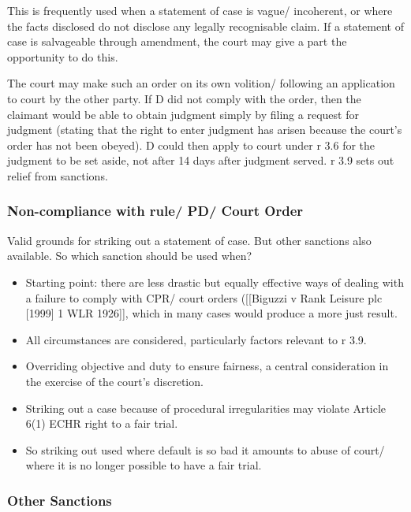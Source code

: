 \documentclass[
]{article}
\providecommand{\tightlist}{%
  \setlength{\itemsep}{0pt}\setlength{\parskip}{0pt}}
\begin{document}
This is frequently used when a statement of case is vague/ incoherent,
or where the facts disclosed do not disclose any legally recognisable
claim. If a statement of case is salvageable through amendment, the
court may give a part the opportunity to do this.

The court may make such an order on its own volition/ following an
application to court by the other party. If D did not comply with the
order, then the claimant would be able to obtain judgment simply by
filing a request for judgment (stating that the right to enter judgment
has arisen because the court's order has not been obeyed). D could then
apply to court under r 3.6 for the judgment to be set aside, not after
14 days after judgment served. r 3.9 sets out relief from sanctions.

\hypertarget{non-compliance-with-rule-pd-court-order}{%
\subsubsection{Non-compliance with rule/ PD/ Court
Order}\label{non-compliance-with-rule-pd-court-order}}

Valid grounds for striking out a statement of case. But other sanctions
also available. So which sanction should be used when?

\begin{itemize}
\tightlist
\item
  Starting point: there are less drastic but equally effective ways of
  dealing with a failure to comply with CPR/ court orders ({[}{[}Biguzzi
  v Rank Leisure plc {[}1999{]} 1 WLR 1926{]}{]}, which in many cases
  would produce a more just result.
\item
  All circumstances are considered, particularly factors relevant to r
  3.9.
\item
  Overriding objective and duty to ensure fairness, a central
  consideration in the exercise of the court's discretion.
\item
  Striking out a case because of procedural irregularities may violate
  Article 6(1) ECHR right to a fair trial.
\item
  So striking out used where default is so bad it amounts to abuse of
  court/ where it is no longer possible to have a fair trial.
\end{itemize}

\hypertarget{other-sanctions}{%
\subsubsection{Other Sanctions}\label{other-sanctions}}
\end{document}
